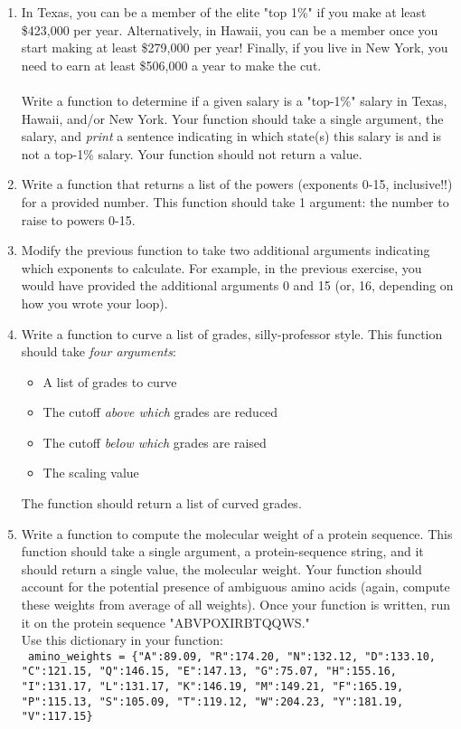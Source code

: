 \documentclass{article}[12pt]
\newcommand{\code}[1]{\texttt{#1}}  %
\begin{document}
\begin{enumerate}

	\item In Texas, you can be a member of the elite "top 1\%" if you make at least \$423,000 per year. Alternatively, in Hawaii, you can be a member once you start making at least \$279,000 per year! Finally, if you live in New York, you need to earn at least \$506,000 a year to make the cut. \\\\ Write a function to determine if a given salary is a "top-1\%" salary in Texas, Hawaii, and/or New York. Your function should take a single argument, the salary, and \emph{print} a sentence indicating in which state(s) this salary is and is not a top-1\% salary. Your function should not return a value.
	
	\item Write a function that returns a list of the powers (exponents 0-15, inclusive!!) for a provided number. This function should take 1 argument: the number to raise to powers 0-15.
	
	\item Modify the previous function to take two additional arguments indicating which exponents to calculate. For example, in the previous exercise, you would have provided the additional arguments 0 and 15 (or, 16, depending on how you wrote your loop). 
	
	\item Write a function to curve a list of grades, silly-professor style. This function should take \emph{four arguments}:
	\begin{itemize}
		\item A list of grades to curve
		\item The cutoff \emph{above which} grades are reduced
		\item The cutoff \emph{below which} grades are raised
		\item The scaling value
	\end{itemize}
	The function should return a list of curved grades. 
	
	\item Write a function to compute the molecular weight of a protein sequence. This function should take a single argument, a protein-sequence string, and it should return a single value, the molecular weight. Your function should account for the potential presence of ambiguous amino acids (again, compute these weights from average of all weights). Once your function is written, run it on the protein sequence "ABVPOXIRBTQQWS." \\ Use this dictionary in your function:
	\\ \code{ amino\_weights = \{"A":89.09, "R":174.20, "N":132.12, "D":133.10, "C":121.15, "Q":146.15, "E":147.13, "G":75.07, "H":155.16, "I":131.17, "L":131.17, "K":146.19, "M":149.21, "F":165.19, "P":115.13, "S":105.09, "T":119.12, "W":204.23, "Y":181.19, "V":117.15\}} 
	

\end{enumerate}
\end{document}
